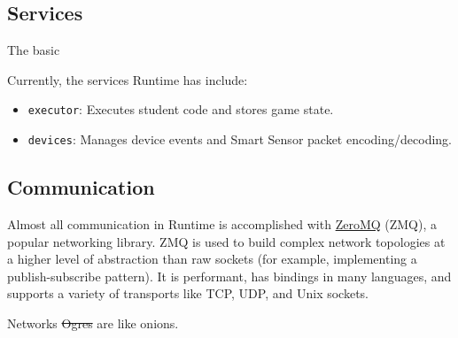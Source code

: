 \documentclass[12pt]{book}
\begin{document}
  \subsection{Services}

  The basic


  Currently, the services Runtime has include:
  \begin{itemize}
  \item \texttt{executor}: Executes student code and stores game state.
  \item \texttt{devices}: Manages device events and Smart Sensor packet encoding/decoding.
  \end{itemize}

  \subsection{Communication}

  Almost all communication in Runtime is accomplished with \href{https://zeromq.org/}{ZeroMQ} (ZMQ), a popular networking library.
  ZMQ is used to build complex network topologies at a higher level of abstraction than raw sockets (for example, implementing a publish-subscribe pattern).
  It is performant, has bindings in many languages, and supports a variety of transports like TCP, UDP, and Unix sockets.

  \begin{displayquote}
    Networks \sout{Ogres} are like onions.
  \end{displayquote}

\end{document}
